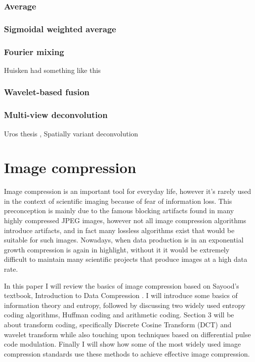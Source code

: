 \documentclass{diploma_style}
\begin{document}
		\subsubsection{Average}
		\subsubsection{Sigmoidal weighted average}
		\subsubsection{Fourier mixing}
		Huisken had something like this
		\subsubsection{Wavelet-based fusion}
		\subsubsection{Multi-view deconvolution}
		
		\cite{krzic_multiple-view_2009} Uros thesis
		\cite{temerinac-ott_multiview_2012}, \cite{temerinac-ott_spatially-variant_2011} Spatially variant deconvolution
		
		
\section{Image compression}
Image compression is an important tool for everyday life, however it's rarely used in the context of scientific imaging because of fear of information loss. This preconception is mainly due to the famous blocking artifacts found in many highly compressed JPEG images, however not all image compression algorithms introduce artifacts, and in fact many lossless algorithms exist that would be suitable for such images. Nowadays, when data production is in an exponential growth compression is again in highlight, without it it would be extremely difficult to maintain many scientific projects that produce images at a high data rate. 

In this paper I will review the basics of image compression based on Sayood's textbook, Introduction to Data Compression \cite{sayood_introduction_2012}. 
I will introduce some basics of information theory and entropy, followed by discussing two widely used entropy coding algorithms, Huffman coding and arithmetic coding. Section 3 will be about transform coding, specifically Discrete Cosine Transform (DCT) and wavelet transform while also touching upon techniques based on differential pulse code modulation. Finally I will show how some of the most widely used image compression standards use these methods to achieve effective image compression.
\end{document}
